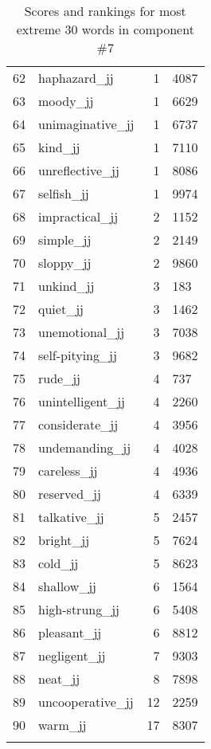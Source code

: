 \begin{longtable}[!htbp]{| rlr@{.}l |}
    62 & haphazard\_jj & 1 & 4087 \\
    63 & moody\_jj & 1 & 6629 \\
    64 & unimaginative\_jj & 1 & 6737 \\
    65 & kind\_jj & 1 & 7110 \\
    66 & unreflective\_jj & 1 & 8086 \\
    67 & selfish\_jj & 1 & 9974 \\
    68 & impractical\_jj & 2 & 1152 \\
    69 & simple\_jj & 2 & 2149 \\
    70 & sloppy\_jj & 2 & 9860 \\
    71 & unkind\_jj & 3 & 183 \\
    72 & quiet\_jj & 3 & 1462 \\
    73 & unemotional\_jj & 3 & 7038 \\
    74 & self-pitying\_jj & 3 & 9682 \\
    75 & rude\_jj & 4 & 737 \\
    76 & unintelligent\_jj & 4 & 2260 \\
    77 & considerate\_jj & 4 & 3956 \\
    78 & undemanding\_jj & 4 & 4028 \\
    79 & careless\_jj & 4 & 4936 \\
    80 & reserved\_jj & 4 & 6339 \\
    81 & talkative\_jj & 5 & 2457 \\
    82 & bright\_jj & 5 & 7624 \\
    83 & cold\_jj & 5 & 8623 \\
    84 & shallow\_jj & 6 & 1564 \\
    85 & high-strung\_jj & 6 & 5408 \\
    86 & pleasant\_jj & 6 & 8812 \\
    87 & negligent\_jj & 7 & 9303 \\
    88 & neat\_jj & 8 & 7898 \\
    89 & uncooperative\_jj & 12 & 2259 \\
    90 & warm\_jj & 17 & 8307 \\
    \hline
    \caption{Scores and rankings for most extreme 30 words in component \#7} \\
\end{longtable}
